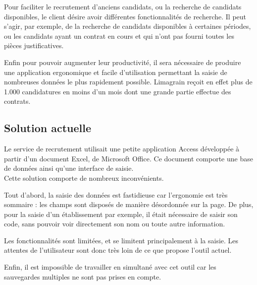Pour faciliter le recrutement d'anciens candidats, ou la recherche de candidats disponibles, le client désire avoir différentes fonctionnalités de recherche.
Il peut s'agir, par exemple, de la recherche de candidats disponibles à certaines périodes, ou les candidats ayant un contrat en cours et qui n'ont pas fourni toutes les pièces justificatives.

Enfin pour pouvoir augmenter leur productivité, il sera nécessaire de produire une application ergonomique et facile d'utilisation permettant la saisie de nombreuses données le plus rapidement possible.
Limagrain reçoit en effet plus de 1.000 candidatures en moins d'un mois dont une grande partie effectue des contrats.


\subsection{Solution actuelle}

Le service de recrutement utilisait une petite application Access développée à partir d'un document Excel, de Microsoft Office.
Ce document comporte une base de données ainsi qu'une interface de saisie.
\\

Cette solution comporte de nombreux inconvénients.

Tout d'abord, la saisie des données est fastidieuse car l'ergonomie est très sommaire : les champs sont disposés de manière désordonnée sur la page.
De plus, pour la saisie d'un établissement par exemple, il était nécessaire de saisir son code, sans pouvoir voir directement son nom ou toute autre information.

Les fonctionnalités sont limitées, et se limitent principalement à la saisie.
Les attentes de l'utilisateur sont donc très loin de ce que propose l'outil actuel.

Enfin, il est impossible de travailler en simultané avec cet outil car les sauvegardes multiples ne sont pas prises en compte.


